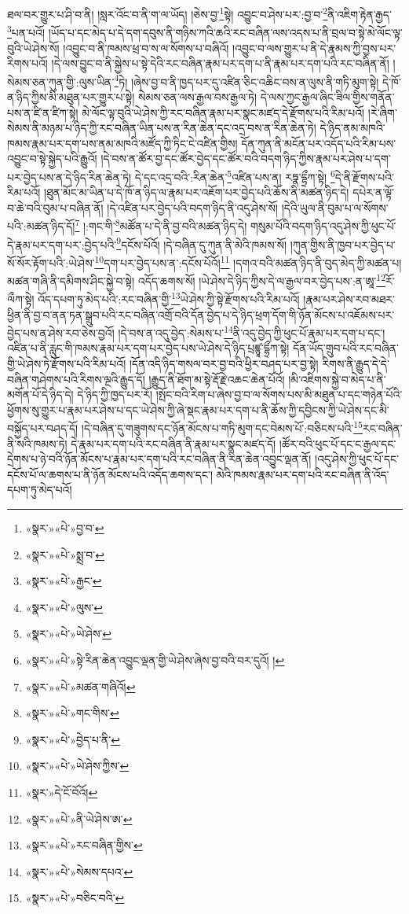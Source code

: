 ཐལ་བར་གྱུར་པ་ཤི་བ་ནི། །སླར་འོང་བ་ནི་ག་ལ་ཡོད། །ཅེས་བྱ་\footnote{«སྣར་»«པེ་»བྱ་བ་}སྟེ། འབྱུང་བ་ཤེས་པར་:བྱ་བ་\footnote{«སྣར་»«པེ་»སྨྲ་བ་}ནི་འཇིག་རྟེན་རྒྱད་\footnote{«སྣར་»«པེ་»རྒྱང་}པན་པའོ། །ཡོད་པ་དང་མེད་པ་དེ་དག་དབུས་ནི་གཉིས་ཀའི་ཆའི་རང་བཞིན་ལས་འདས་པ་ནི་བྲལ་བ་སྟེ་མེ་ལོང་ལྟ་བུའི་ཡེ་ཤེས་སོ། །འབྱུང་བ་ནི་ཁམས་ཕྲ་བ་ས་ལ་སོགས་པ་བཞིའོ། །འབྱུང་བ་ལས་གྱུར་པ་ནི་དེ་རྣམས་ཀྱི་བྱས་པར་རིགས་པའོ། །དེ་ལས་བྱུང་བ་ནི་སྐྱེས་པ་སྟེ་དེའི་རང་བཞིན་རྣམ་པར་དག་པ་ནི་རྣམ་པར་དག་པའི་རང་བཞིན་ནོ། །སེམས་ཅན་ཀུན་གྱི་:ལུས་ཡིན་\footnote{«སྣར་»«པེ་»ལུས་}ཏེ། །ཞེས་བྱ་བ་ནི་ཁྱད་པར་དུ་འཛིན་ཅིང་འཆིང་བས་ན་ལུས་ནི་གཏི་མུག་སྟེ། དེ་ཁོ་ན་ཉིད་ཀྱིས་མི་མཐུན་པར་གྱུར་པ་སྟེ། སེམས་ཅན་ལས་རྒྱལ་བས་རྒྱལ་ཏེ། དེ་ལས་ཀྱང་རྒྱལ་ཞིང་ཟིལ་གྱིས་གནོན་པས་ན་ཛི་ན་ཛིཀ་སྟེ། མེ་ལོང་ལྟ་བུའི་ཡེ་ཤེས་ཀྱི་རང་བཞིན་རྣམ་པར་སྣང་མཛད་དེ་རྫོགས་པའི་རིམ་པའོ། །རེ་ཞིག་སེམས་ནི་མཉམ་པ་ཉིད་ཀྱི་རང་བཞིན་ཡིན་པས་ན་རིན་ཆེན་དང་འདྲ་བས་ན་རིན་ཆེན་ཏེ། དེ་ཉིད་ནམ་མཁའི་ཁམས་རྣམ་པར་དག་པས་ནམ་མཁའི་མཛོད་ཀྱི་ཏིང་ངེ་འཛིན་གྱིས། དོན་ཀུན་ནི་མངོན་པར་འདོད་པའི་རིམ་པས་འབྱུང་བ་སྟེ་སྐྱེད་པའི་རྒྱུའོ། །དེ་བས་ན་ཚོར་བྱ་དང་ཚོར་བྱེད་དང་ཚོར་བའི་བདག་ཉིད་ཀྱིས་རྣམ་པར་ཤེས་པ་དག་པར་བྱེད་པས་ན་དེ་ཉིད་རིན་ཆེན་ཏེ། དེ་དང་འདྲ་བའི་:རིན་ཆེན་\footnote{«སྣར་»«པེ་»ཡེ་ཤེས་}འཛིན་པས་ན། རཏྣ་དྷྲྀཀ་སྟེ། \footnote{«སྣར་»«པེ་»སྟེ་རིན་ཆེན་འབྱུང་ལྡན་གྱི་ཡེ་ཤེས་ཞེས་བྱ་བའི་བར་དུའོ། ། }དེ་ནི་རྫོགས་པའི་རིམ་པའོ། །ཐུན་མོང་མ་ཡིན་པ་དེ་ཁོ་ན་ཉིད་ལ་རྣམ་པར་འཇོག་པར་བྱེད་པའི་ཆོས་ནི་མཚན་ཉིད་དེ། དཔེར་ན་ལྟོ་བ་ཆེ་བའི་བུམ་པ་བཞིན་ནོ། །དེ་འཛིན་པར་བྱེད་པའི་བདག་ཉིད་ནི་འདུ་ཤེས་སོ། །དེའི་ཡུལ་ནི་བུམ་པ་ལ་སོགས་པའི་:མཚན་ཉིད་དོ།\footnote{«སྣར་»«པེ་»མཚན་གཞིའོ།} །:གང་གི་\footnote{«སྣར་»«པེ་»གང་གིས་}མཚོན་པ་དེ་ནི་བྱ་བའི་མཚན་ཉིད་དེ། གསུམ་པོའི་བདག་ཉིད་འདུ་ཤེས་ཀྱི་ཕུང་པོ་དེ་རྣམ་པར་དག་པར་:བྱེད་པའི་\footnote{«སྣར་»«པེ་»བྱེད་པ་ནི་}དངོས་པོའོ། །དེ་བཞིན་དུ་ཀུན་ནི་མེའི་ཁམས་སོ། །ཀུན་གྱིས་ནི་ཁྱབ་པར་བྱེད་པ་སོ་སོར་རྟོག་པའི་:ཡེ་ཤེས་\footnote{«སྣར་»«པེ་»ཡེ་ཤེས་ཀྱིས་}དག་པར་བྱེད་པས་ན་:དངོས་པོའོ།\footnote{«སྣར་»དེ་ངོ་བོའོ།} །དགའ་བའི་མཚན་ཉིད་ནི་བུད་མེད་ཀྱི་མཚན་པ། མཚན་གཞི་ནི་དམིགས་ཤིང་སྐྱེ་བ་སྟེ། འདོད་ཆགས་སོ། །ཡེ་ཤེས་དེ་ཉིད་ཀྱིས་དེ་ལ་རྒྱལ་བར་བྱེད་པས་:ན་ཨཱ་\footnote{«སྣར་»«པེ་»ནི་ཡེ་ཤེས་ཨ་}རོ་ལྀཀ་སྟེ། འོད་དཔག་ཏུ་མེད་པའི་:རང་བཞིན་གྱི་\footnote{«སྣར་»«པེ་»རང་བཞིན་གྱིས་}ཡེ་ཤེས་ཀྱི་སྟེ་རྫོགས་པའི་རིམ་པའོ། །རྣམ་པར་ཤེས་རབ་མཐར་ཕྱིན་ནི་བྱ་བ་ནན་ཏན་སྒྲུབ་པའི་རང་བཞིན་འགྲོ་བའི་དོན་བྱེད་པ་དེ་ཉིད་ཕྲག་དོག་གི་ཉོན་མོངས་པ་འཇོམས་པར་བྱེད་པས་ན་ཤེས་རབ་ཅེས་བྱའོ། །དེ་བས་ན་འདུ་བྱེད་:སེམས་པ་\footnote{«སྣར་»«པེ་»སེམས་དཔའ་}ནི་འདུ་བྱེད་ཀྱི་ཕུང་པོ་རྣམ་པར་དག་པ་དང་། འཛིན་པ་ནི་རླུང་གི་ཁམས་རྣམ་པར་དག་པར་བྱེད་པས་ཡེ་ཤེས་དེ་ཉིད་པྲཛྙཱ་དྷྲྀཀ་སྟེ། དོན་ཡོད་གྲུབ་པའི་རང་བཞིན་གྱི་ཡེ་ཤེས་ཏེ་རྫོགས་པའི་རིམ་པའོ། །དོན་འདི་ཉིད་གསལ་བར་བྱ་བའི་ཕྱིར་བཤད་པར་བྱ་སྟེ། རིགས་ནི་རྒྱུད་དེ་དེ་བཞིན་གཤེགས་པའི་རིགས་ལྔའི་རྒྱུད་དོ། །རྒྱུད་ནི་ཐོག་མ་སྟེ་རྡོ་རྗེ་འཆང་ཆེན་པོའོ། །མི་འཇིགས་སྐྱེ་བ་མེད་པ་ནི་མགོན་པོ་དེ་ཉིད་དེ། དེ་ཉིད་ཀྱི་ཁྱད་པར་རོ། །སྤོང་བའི་རིག་པ་ཞེས་བྱ་བ་ལ་སོགས་པས་མི་མཐུན་པ་དང་གཉེན་པོའི་ཕྱོགས་སུ་གྱུར་པ་རྣམ་པར་ཤེས་པ་དང་ཡེ་ཤེས་ཀྱི་ཞེ་སྡང་རྣམ་པར་དག་པ་ནི་ཆོས་ཀྱི་དབྱིངས་ཀྱི་ཡེ་ཤེས་དང་མི་བསྐྱོད་པར་བཤད་དོ། །དེ་བཞིན་དུ་གཟུགས་དང་ཉོན་མོངས་པ་གཏི་མུག་དང་བེམས་པོ་:བཅིངས་པའི་\footnote{«སྣར་»«པེ་»བཅིང་བའི་}རང་བཞིན་ནི་སའི་ཁམས་ཏེ། དེ་རྣམ་པར་དག་པའི་རང་བཞིན་ནི་རྣམ་པར་སྣང་མཛད་དོ། །ཚོར་བའི་ཕུང་པོ་དང་ང་རྒྱལ་དང་དྲེགས་པ་ཉེ་བའི་ཉོན་མོངས་པ་རྣམ་པར་དག་པའི་རང་བཞིན་ནི་རིན་ཆེན་འབྱུང་ལྡན་ནོ། །འདུ་ཤེས་ཀྱི་ཕུང་པོ་དང་དངོས་པོ་ལ་ཆགས་པ་ནི་ཉོན་མོངས་པའི་འདོད་ཆགས་དང་། མེའི་ཁམས་རྣམ་པར་དག་པའི་རང་བཞིན་ནི་འོད་དཔག་ཏུ་མེད་པའོ། 